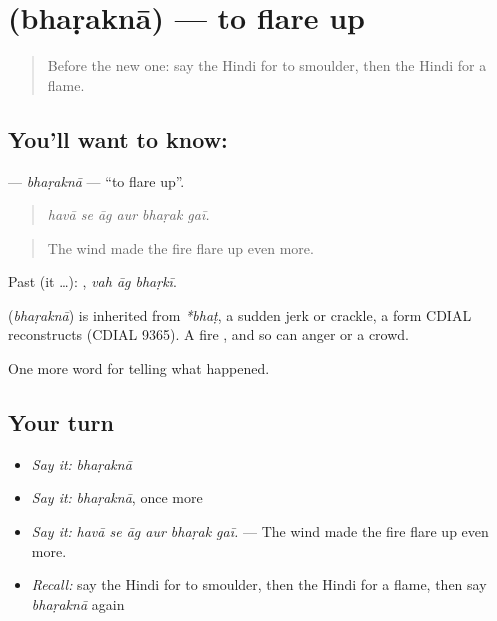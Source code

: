 \section[\texorpdfstring{\hi{भड़कना} (bhaṛaknā)}{भड़कना (bhaṛaknā)}]{ (bhaṛaknā) — to flare up}

\label{lesson:HI-C299-bharakna}



\begin{quote}
Before the new one: say the Hindi for to smoulder, then the Hindi for a flame.
\end{quote}

\subsection*{You'll want to know: }
\textbf{} — \emph{bhaṛaknā} — \textquotedblleft{}to flare up\textquotedblright{}.

\begin{quote}
     
\end{quote}

\begin{quote}
\emph{havā se āg aur bhaṛak gaī.}
\end{quote}

\begin{quote}
The wind made the fire flare up even more.
\end{quote}

Past (it …):   , \emph{vah āg bhaṛkī}.

\begin{cousinweb}
\textbf{} (\emph{bhaṛaknā}) is inherited from \emph{*bhaṭ}, a sudden jerk or crackle, a form CDIAL reconstructs (CDIAL 9365). A fire \textbf{ }, and so can anger or a crowd.
\end{cousinweb}

\begin{grammarlens}[title={What you've built}]
One more word for telling what happened.
\end{grammarlens}

\subsection*{Your turn}
\begin{itemize}
\raggedright
  \item \emph{Say it:} \emph{bhaṛaknā}
  \item \emph{Say it:} \emph{bhaṛaknā}, once more
  \item \emph{Say it:} \emph{havā se āg aur bhaṛak gaī.} — The wind made the fire flare up even more.
  \item \emph{Recall:} say the Hindi for to smoulder, then the Hindi for a flame, then say \emph{bhaṛaknā} again
\end{itemize}

